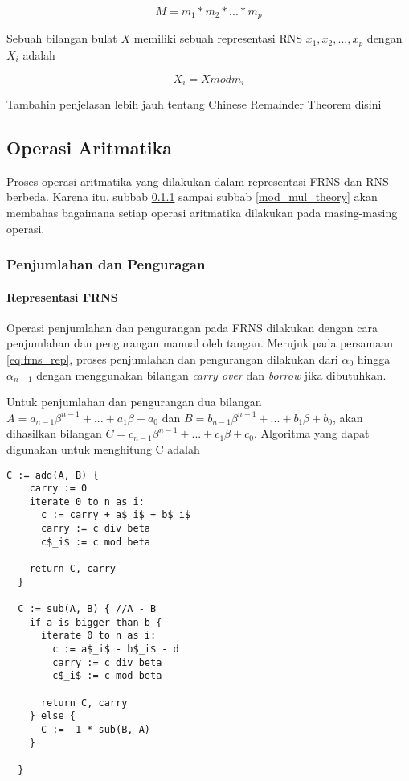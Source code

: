 \begin{equation}
  M = m_1 * m_2 * ... * m_p
\end{equation}

Sebuah bilangan bulat $X$ memiliki sebuah representasi RNS ${x_1,x_2,...,x_p}$ dengan $X_i$ adalah

\begin{equation}
  X_i = X mod m_i
\end{equation}

\colorbox{BurntOrange}{Tambahin penjelasan lebih jauh tentang Chinese Remainder Theorem disini}

\subsection{Operasi Aritmatika}
Proses operasi aritmatika yang dilakukan dalam representasi FRNS dan RNS berbeda. Karena itu, subbab \ref{add_sub_theory} sampai subbab \ref{mod_mul_theory} akan membahas bagaimana setiap operasi aritmatika dilakukan pada masing-masing operasi.

\subsubsection{Penjumlahan dan Penguragan} \label{add_sub_theory}
\paragraph{Representasi FRNS}

Operasi penjumlahan dan pengurangan pada FRNS dilakukan dengan cara penjumlahan dan pengurangan manual oleh tangan. Merujuk pada persamaan \ref{eq:frns_rep}, proses penjumlahan dan pengurangan dilakukan dari $\alpha_0$ hingga $\alpha_{n-1}$ dengan menggunakan bilangan \textit{carry over} dan \textit{borrow} jika dibutuhkan.

Untuk penjumlahan dan pengurangan dua bilangan $A = a_{n-1}\beta^{n-1}+...+a_{1}\beta+a_{0}$ dan $B = b_{n-1}\beta^{n-1}+...+b_{1}\beta+b_{0}$, akan dihasilkan bilangan $C = c_{n-1}\beta^{n-1}+...+c_{1}\beta+c_{0}$. Algoritma yang dapat digunakan untuk menghitung C adalah
\begin{lstlisting}[basicstyle=\footnotesize\rmfamily]
  C := add(A, B) {
    carry := 0
    iterate 0 to n as i:
      c := carry + a$_i$ + b$_i$
      carry := c div beta
      c$_i$ := c mod beta

    return C, carry
  }

  C := sub(A, B) { //A - B
    if a is bigger than b {
      iterate 0 to n as i:
        c := a$_i$ - b$_i$ - d
        carry := c div beta
        c$_i$ := c mod beta

      return C, carry
    } else {
      C := -1 * sub(B, A)
    }

  }
\end{lstlisting}

